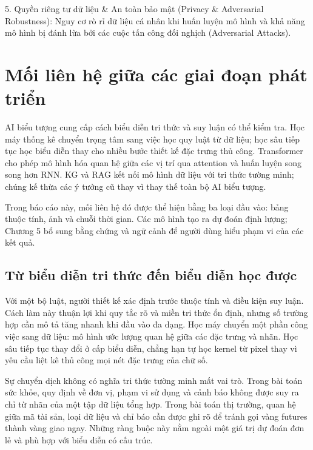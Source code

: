 5. Quyền riêng tư dữ liệu \& An toàn bảo mật (Privacy \& Adversarial
Robustness): Nguy cơ rò rỉ dữ liệu cá nhân khi huấn luyện mô hình và khả
năng mô hình bị đánh lừa bởi các cuộc tấn công đối nghịch (Adversarial
Attacks).

\section{Mối liên hệ giữa các giai đoạn phát triển}\label{mux1ed1i-liuxean-hux1ec7-giux1eefa-cuxe1c-giai-ux111oux1ea1n-phuxe1t-triux1ec3n}

AI biểu tượng cung cấp cách biểu diễn tri thức và suy luận có thể kiểm
tra. Học máy thống kê chuyển trọng tâm sang việc học quy luật từ dữ
liệu; học sâu tiếp tục học biểu diễn thay cho nhiều bước thiết kế đặc
trưng thủ công. Transformer cho phép mô hình hóa quan hệ giữa các vị trí
qua attention và huấn luyện song song hơn RNN. KG và RAG kết nối mô hình
dữ liệu với tri thức tường minh; chúng kế thừa các ý tưởng cũ thay vì
thay thế toàn bộ AI biểu tượng.

Trong báo cáo này, mối liên hệ đó được thể hiện bằng ba loại đầu vào:
bảng thuộc tính, ảnh và chuỗi thời gian. Các mô hình tạo ra dự đoán định
lượng; Chương 5 bổ sung bằng chứng và ngữ cảnh để người dùng hiểu phạm
vi của các kết quả.

\subsection{Từ biểu diễn tri thức đến biểu diễn học được}\label{tux1eeb-biux1ec3u-diux1ec5n-tri-thux1ee9c-ux111ux1ebfn-biux1ec3u-diux1ec5n-hux1ecdc-ux111ux1b0ux1ee3c}

Với một bộ luật, người thiết kế xác định trước thuộc tính và điều kiện
suy luận. Cách làm này thuận lợi khi quy tắc rõ và miền tri thức ổn
định, nhưng số trường hợp cần mô tả tăng nhanh khi đầu vào đa dạng. Học
máy chuyển một phần công việc sang dữ liệu: mô hình ước lượng quan hệ
giữa các đặc trưng và nhãn. Học sâu tiếp tục thay đổi ở cấp biểu diễn,
chẳng hạn tự học kernel từ pixel thay vì yêu cầu liệt kê thủ công mọi
nét đặc trưng của chữ số.

Sự chuyển dịch không có nghĩa tri thức tường minh mất vai trò. Trong bài
toán sức khỏe, quy định về đơn vị, phạm vi sử dụng và cảnh báo không
được suy ra chỉ từ nhãn của một tập dữ liệu tổng hợp. Trong bài toán thị
trường, quan hệ giữa mã tài sản, loại dữ liệu và chỉ báo cần được ghi rõ
để tránh gọi vàng futures thành vàng giao ngay. Những ràng buộc này nằm
ngoài một giá trị dự đoán đơn lẻ và phù hợp với biểu diễn có cấu trúc.

